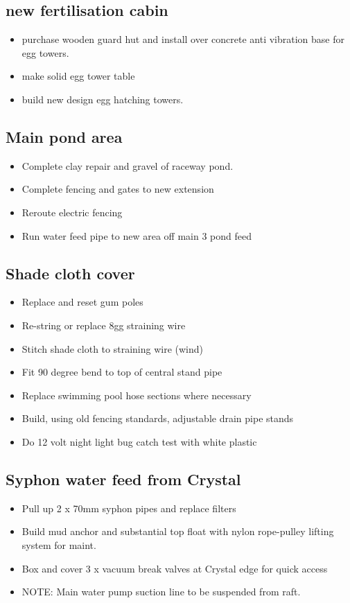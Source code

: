 \subsection{new fertilisation cabin}
\begin{itemize}
\item purchase wooden guard hut and install over concrete anti vibration base for egg towers.
\item make solid egg tower table  
\item build new design egg hatching towers.
\end{itemize}


\subsection{Main pond area}     
\begin{itemize}
\item Complete clay repair and gravel of raceway pond.    
\item Complete fencing and gates to new extension   
\item Reroute electric fencing
\item Run water feed pipe to new area off main 3 pond feed
\end{itemize}

\subsection{Shade cloth cover}  
\begin{itemize}
\item Replace and reset gum poles  
\item Re-string or replace 8gg straining wire 
\item Stitch shade cloth to straining wire (wind)
\item Fit 90 degree bend to top of central stand pipe  
\item Replace swimming pool hose sections where necessary
\item Build, using old fencing standards, adjustable drain pipe stands
\item Do 12 volt night light bug catch test with white plastic 
\end{itemize}


\subsection{Syphon water feed from Crystal}
\begin{itemize}
\item  Pull up 2 x 70mm syphon pipes and replace filters
\item Build mud anchor and substantial top float with nylon rope-pulley lifting system for maint.
\item Box and cover 3 x vacuum break valves at Crystal edge for quick access
\item NOTE: Main water pump suction line to be suspended from raft.
\end{itemize}


